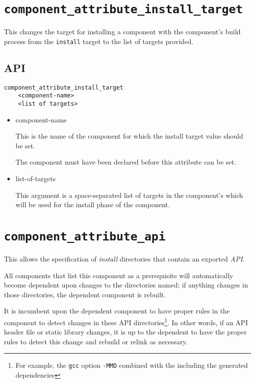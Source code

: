 \section{\texttt{component\_attribute\_install\_target}}\label{api:component-attribute-install-target}

This changes the target for installing a component with the
component's build process from the \texttt{install} \make target to
the list of targets provided.

\subsection{API}

\begin{verbatim}
component_attribute_install_target
    <component-name>
    <list of targets>
\end{verbatim}

\begin{itemize}
\item component-name

  This is the name of the component for which the install target value
  should be set.

  The component must have been declared before this attribute can be
  set.

\item list-of-targets

  This argument is a space-separated list of targets in the
  component's \makefile which will be used for the install phase of
  the component.

\end{itemize}

\section{\texttt{component\_attribute\_api}}\label{api:component-attribute-api}

This allows the specification of \emph{install} directories that
contain an exported \emph{API}.

All components that list this component as a prerequisite will
automatically become dependent upon changes to the directories named;
if anything changes in those directories, the dependent component is
rebuilt.

It is incumbent upon the dependent component to have proper rules in
the component \makefile to detect changes in these API
directories\footnote{For example, the \texttt{gcc} option
  \texttt{-MMD} combined with the \makefile including the generated
  dependencies}.  In other words, if an API header file or static
library changes, it is up to the dependent \makefile to have the
proper rules to detect this change and rebuild or relink as necessary.

